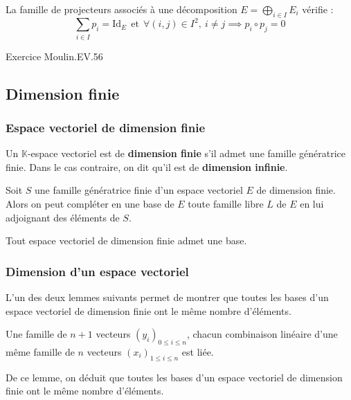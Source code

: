 \documentclass[french]{article}
\newcommand{\K}{\mathbb{K}}
\theoremstyle{plain}
\theoremstyle{definition}
\theoremstyle{remark}
\begin{document}
\begin{prop}
	La famille de projecteurs associés à une décomposition $E=\displaystyle\bigoplus_{i\in I}E_i$ vérifie : $$\sum_{i\in I}p_i=\text{Id}_E\ \ \text{et}\ \ \forall (i,j)\in I^2,\ i\ne j\implies p_i\circ p_j=0$$
\end{prop}

Exercice Moulin.EV.56

\subsection{Dimension finie}

\subsubsection*{Espace vectoriel de dimension finie}

\begin{dfn}
	Un $\K$-espace vectoriel est de \textbf{dimension finie} s'il admet une famille génératrice finie. Dans le cas contraire, on dit qu'il est de \textbf{dimension infinie}.
\end{dfn}

\begin{thm}%
	Soit $S$ une famille génératrice finie d'un espace vectoriel $E$ de dimension finie. Alors on peut compléter en une base de $E$ toute famille libre $L$ de $E$ en lui adjoignant des éléments de $S$.
\end{thm}

\begin{cor}%
	Tout espace vectoriel de dimension finie admet une base.
\end{cor}

\subsubsection*{Dimension d'un espace vectoriel}
L'un des deux lemmes suivants permet de montrer que toutes les bases d'un espace vectoriel de dimension finie ont le même nombre d'éléments.

\begin{lem}%
	Une famille de $n+1$ vecteurs $(y_i)_{0\leqslant i\leqslant n}$, chacun combinaison linéaire d'une même famille de $n$ vecteurs $(x_i)_{1\leqslant i\leqslant n}$ est liée.
\end{lem}

De ce lemme, on déduit que toutes les bases d'un espace vectoriel de dimension finie ont le même nombre d'éléments.
\end{document}
